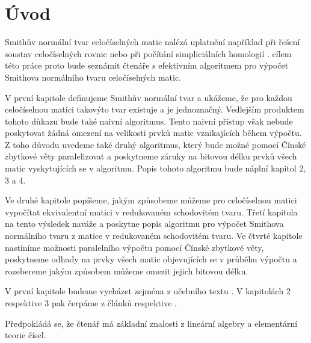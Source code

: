 \chapter*{Úvod}

Smithův normální tvar celočíselných matic nalézá uplatnění například při řešení
soustav celočíselných rovnic nebo při počítání simpliciálních homologií \cite{Simplic_Homo}.
cílem této práce proto bude seznámit čtenáře s efektivním
algoritmem pro výpočet Smithova normálního tvaru celočíselných matic.

V první kapitole definujeme Smithův normální tvar a ukážeme, že pro každou
celočíselnou matici takovýto tvar existuje a je jednoznačný. Vedlejším produktem
tohoto důkazu bude také naivní algoritmus.
Tento naivní přístup však nebude poskytovat žádná omezení na velikosti prvků
matic vznikajících během výpočtu. Z toho důvodu uvedeme také druhý algoritmus, který
bude možné pomocí Čínské zbytkové věty paralelizovat a poskytneme záruky na
bitovou délku prvků všech matic vyskytujících se v algoritmu.
Popis tohoto algoritmu bude náplní kapitol 2, 3 a 4.

Ve druhé kapitole popíšeme, jakým způsobeme můžeme pro celočíselnou matici
vypočítat ekvivalentní matici v redukovaném schodovitém tvaru. Třetí kapitola
na tento výsledek naváže a poskytne popis algoritmu pro výpočet Smithova
normálního tvaru z matice v redukovaném schodovitém tvaru. Ve čtvrté kapitole
nastíníme možnosti paralelního výpočtu pomocí Čínské zbytkové věty, poskytneme
odhady na prvky všech matic objevujících se v průběhu výpočtu a rozebereme
jakým způsobem můžeme omezit jejich bitovou délku.

V první kapitole budeme vycházet zejména z učebního textu \cite{vokr}. V 
kapitolách 2 respektive 3 pak čerpáme z článků \cite{triang} respektive 
\cite{SNF_Arne}.

Předpokládá se, že čtenář má základní znalosti z lineární algebry a
elementární teorie čísel.

\cleardoublepage

